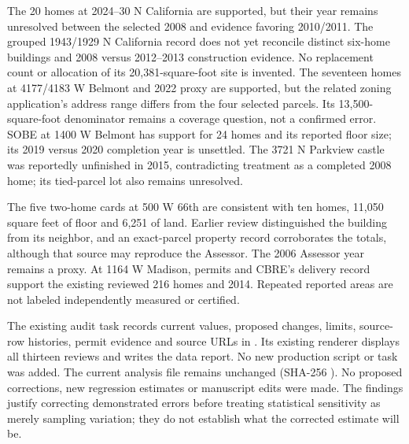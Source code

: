 The 20 homes at 2024--30 N California are supported, but their year remains
unresolved between the selected 2008 and evidence favoring 2010/2011.
The grouped 1943/1929 N California record does not yet reconcile distinct
six-home buildings and 2008 versus 2012--2013 construction evidence.
No replacement count or allocation of its 20,381-square-foot site is
invented. The seventeen homes at 4177/4183 W Belmont and 2022 proxy are
supported, but the related zoning application's address range differs
from the four selected parcels. Its 13,500-square-foot denominator remains
a coverage question, not a confirmed error. SOBE at 1400 W Belmont has
support for 24 homes and its reported floor size; its 2019 versus 2020
completion year is unsettled. The 3721 N Parkview castle was reportedly
unfinished in 2015, contradicting treatment as a completed 2008 home;
its tied-parcel lot also remains unresolved.

The five two-home cards at 500 W 66th are consistent with ten homes,
11,050 square feet of floor and 6,251 of land. Earlier review distinguished
the building from its neighbor, and an exact-parcel property record
corroborates the totals, although that source may reproduce the Assessor.
The 2006 Assessor year remains a proxy. At 1164 W Madison, permits and
CBRE's delivery record support the existing reviewed 216 homes and 2014.
Repeated reported areas are not labeled independently measured or certified.

The existing audit task records current values, proposed changes, limits,
source-row histories, permit evidence and source URLs in
.
Its existing renderer displays all thirteen reviews and writes the data
report. No new production script or task was added. The current analysis
file remains unchanged (SHA-256
).
No proposed corrections, new regression estimates or manuscript edits were
made. The findings justify correcting demonstrated errors before treating
statistical sensitivity as merely sampling variation; they do not establish
what the corrected estimate will be.

